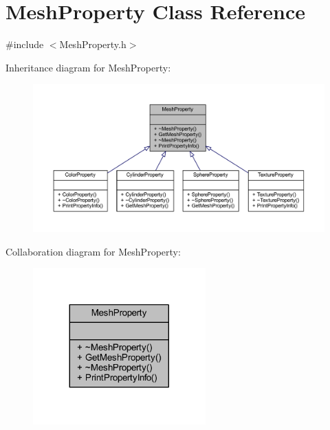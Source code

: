 \hypertarget{class_mesh_property}{}\section{Mesh\+Property Class Reference}
\label{class_mesh_property}


{\ttfamily \#include $<$Mesh\+Property.\+h$>$}



Inheritance diagram for Mesh\+Property\+:\nopagebreak
\begin{figure}[H]
\begin{center}
\leavevmode
\includegraphics[width=350pt]{class_mesh_property__inherit__graph}
\end{center}
\end{figure}


Collaboration diagram for Mesh\+Property\+:\nopagebreak
\begin{figure}[H]
\begin{center}
\leavevmode
\includegraphics[width=188pt]{class_mesh_property__coll__graph}
\end{center}
\end{figure}
